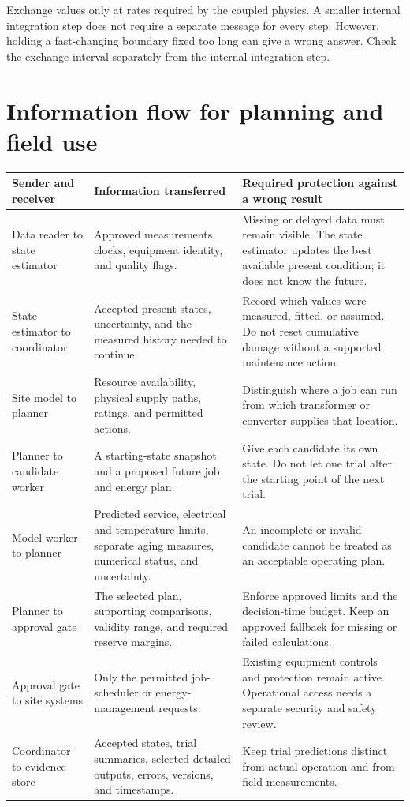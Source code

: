 \documentclass[11pt,a4paper]{report}
\begin{document}
Exchange values only at rates required by the coupled physics.
A smaller internal integration step does not require a separate message for every step.
However, holding a fast-changing boundary fixed too long can give a wrong answer.
Check the exchange interval separately from the internal integration step.

\section{Information flow for planning and field use}
\begin{longtable}{L{0.19\textwidth}L{0.34\textwidth}L{0.35\textwidth}}
\toprule Sender and receiver & Information transferred & Required protection against a wrong result \\ \midrule\endhead
Data reader to state estimator & Approved measurements, clocks, equipment identity, and quality flags. & Missing or delayed data must remain visible. The state estimator updates the best available present condition; it does not know the future. \\
State estimator to coordinator & Accepted present states, uncertainty, and the measured history needed to continue. & Record which values were measured, fitted, or assumed. Do not reset cumulative damage without a supported maintenance action. \\
Site model to planner & Resource availability, physical supply paths, ratings, and permitted actions. & Distinguish where a job can run from which transformer or converter supplies that location. \\
Planner to candidate worker & A starting-state snapshot and a proposed future job and energy plan. & Give each candidate its own state. Do not let one trial alter the starting point of the next trial. \\
Model worker to planner & Predicted service, electrical and temperature limits, separate aging measures, numerical status, and uncertainty. & An incomplete or invalid candidate cannot be treated as an acceptable operating plan. \\
Planner to approval gate & The selected plan, supporting comparisons, validity range, and required reserve margins. & Enforce approved limits and the decision-time budget. Keep an approved fallback for missing or failed calculations. \\
Approval gate to site systems & Only the permitted job-scheduler or energy-management requests. & Existing equipment controls and protection remain active. Operational access needs a separate security and safety review. \\
Coordinator to evidence store & Accepted states, trial summaries, selected detailed outputs, errors, versions, and timestamps. & Keep trial predictions distinct from actual operation and from field measurements. \\
\bottomrule
\end{longtable}
\end{document}
